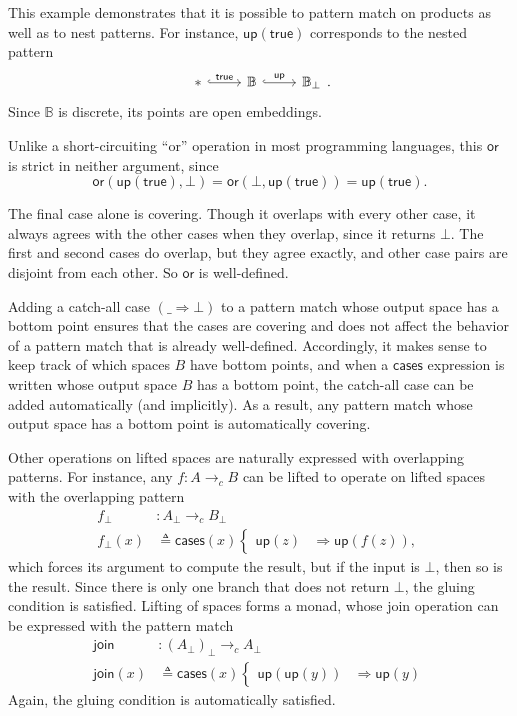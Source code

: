 \documentclass[conference]{IEEEtran}
\newcommand{\cto}{\to_c}
\newcommand{\One}{\ast}
\newcommand{\bool}{\mathbb{B}}
\newcommand{\wildcard}{\_}
\newcommand{\Branch}{\Rightarrow}
\newcommand{\up}{\mathsf{up}}
\begin{document}
This example demonstrates that it is possible to pattern match on products as well as to nest patterns. For instance, $\mathsf{up}(\mathsf{true})$ corresponds to the nested pattern
\begin{equation*}
\begin{tikzcd}
\One \arrow[r, hook, "\mathsf{true}"]
& \bool
   \arrow[r, hook, "\mathsf{up}"]
& \bool_\bot
\end{tikzcd}.
\end{equation*}
Since $\bool$ is discrete, its points are open embeddings.

Unlike a short-circuiting ``or'' operation in most programming languages, this $\mathsf{or}$ is strict in neither argument, since
\[ 
\mathsf{or}(\mathsf{up}(\mathsf{true}), \bot) = 
\mathsf{or}(\bot, \mathsf{up}(\mathsf{true})) =
\mathsf{up}(\mathsf{true}).
\]

The final case alone is covering. Though it overlaps with every other case, it always agrees with the other cases when they overlap, since it returns $\bot$. The first and second cases do overlap, but they agree exactly, and other case pairs are disjoint from each other. So $\mathsf{or}$ is well-defined.

Adding a catch-all case $(\wildcard \Branch \bot)$ to a pattern match whose output space has a bottom point ensures that the cases are covering and does not affect the behavior of a pattern match that is already well-defined. Accordingly, it makes sense to keep track of which spaces $B$ have bottom points, and when a $\mathsf{cases}$ expression is written whose output space $B$ has a bottom point, the catch-all case can be added automatically (and implicitly). As a result, any pattern match whose output space has a bottom point is automatically covering.

Other operations on lifted spaces are naturally expressed with overlapping patterns. For instance, any $f : A \cto B$ can be lifted to operate on lifted spaces with the overlapping pattern
\begin{align*}
f_\bot &: A_\bot \cto B_\bot
\\ f_\bot(x) &\triangleq
  \mathsf{cases}(x)
  \begin{cases}
  \up(z) &\Branch \up(f(z)),
  \end{cases}
\end{align*}
which forces its argument to compute the result, but if the input is $\bot$, then so is the result. Since there is only one branch that does not return $\bot$, the gluing condition is satisfied. Lifting of spaces forms a monad, whose join operation can be expressed with the pattern match
\begin{align*}
\mathsf{join} &: \left( A_\bot \right)_\bot \cto A_\bot
\\ \mathsf{join}(x) &\triangleq \mathsf{cases}(x)
\begin{cases}
\up(\up(y)) &\Branch \up(y)
\end{cases}
\end{align*}
Again, the gluing condition is automatically satisfied.
\end{document}
